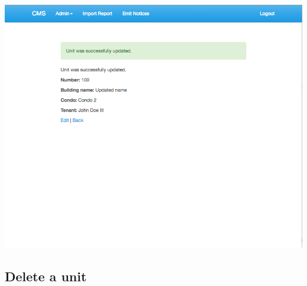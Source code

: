 \begin{itemize}
    \includegraphics[scale=0.25]{./images/ss/unit/edit/5.png}
\end{itemize}

\subsection*{Delete a unit}

